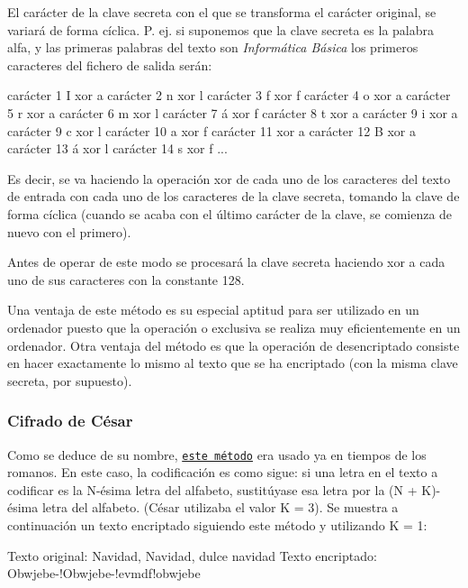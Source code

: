 El carácter de la clave secreta con el que se transforma el carácter original, se variará de forma cíclica. P. ej. si suponemos que la clave secreta es la palabra {\ttfamily alfa}, y las primeras palabras del texto son {\itshape Informática Básica} los primeros caracteres del fichero de salida serán\+:


\begin{DoxyCode}
carácter 1  I xor a
carácter 2  n xor l
carácter 3  f xor f
carácter 4  o xor a
carácter 5  r xor a
carácter 6  m xor l
carácter 7  á xor f
carácter 8  t xor a
carácter 9  i xor a
carácter 9  c xor l
carácter 10 a xor f
carácter 11   xor a
carácter 12 B xor a
carácter 13 á xor l
carácter 14 s xor f
   ...
\end{DoxyCode}


Es decir, se va haciendo la operación {\ttfamily xor} de cada uno de los caracteres del texto de entrada con cada uno de los caracteres de la clave secreta, tomando la clave de forma cíclica (cuando se acaba con el último carácter de la clave, se comienza de nuevo con el primero).

Antes de operar de este modo se procesará la clave secreta haciendo {\ttfamily xor} a cada uno de sus caracteres con la constante 128.

Una ventaja de este método es su especial aptitud para ser utilizado en un ordenador puesto que la operación o exclusiva se realiza muy eficientemente en un ordenador. Otra ventaja del método es que la operación de desencriptado consiste en hacer exactamente lo mismo al texto que se ha encriptado (con la misma clave secreta, por supuesto).

\subsubsection*{Cifrado de César}

Como se deduce de su nombre, \href{https://es.wikipedia.org/wiki/Cifrado_C%C3%A9sar}{\tt este método} era usado ya en tiempos de los romanos. En este caso, la codificación es como sigue\+: si una letra en el texto a codificar es la N-\/ésima letra del alfabeto, sustitúyase esa letra por la (N + K)-\/ésima letra del alfabeto. (César utilizaba el valor K = 3). Se muestra a continuación un texto encriptado siguiendo este método y utilizando K = 1\+:


\begin{DoxyCode}
Texto original:  Navidad, Navidad, dulce navidad
Texto encriptado:  Obwjebe-!Obwjebe-!evmdf!obwjebe
\end{DoxyCode}


